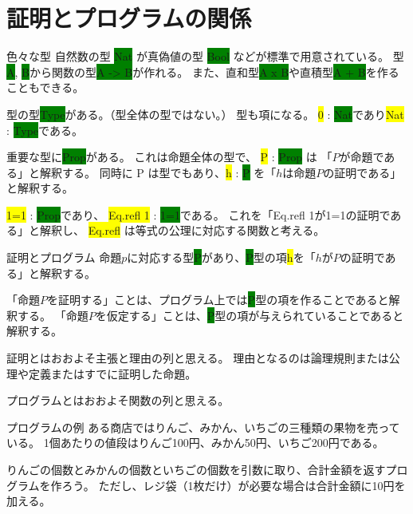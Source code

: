 \documentclass[unicode,12pt]{beamer}%
\newcommand{\type}[1]{\colorbox{green}{#1}}
\newcommand{\term}[1]{\colorbox{yellow}{#1}}
\begin{document}
\section{証明とプログラムの関係}

\begin{frame}{色々な型}
  自然数の型 \type{Nat} が真偽値の型 \type{Bool} などが標準で用意されている。
  型\type{A}, \type{B}から関数の型\type{A -> B}が作れる。
  また、直和型\type{A x B}や直積型\type{A + B}を作ることもできる。

  \pause

  型の型\type{Type}がある。（型全体の型ではない。）
  型も項になる。
  \term{0} : \type{Nat}であり\term{Nat} : \type{Type}である。

  \pause

  重要な型に\type{Prop}がある。
  これは命題全体の型で、 \term{P} : \type{Prop} は 「$P$が命題である」と解釈する。
  同時に P は型でもあり、\term{h} : \type{P} を「$h$は命題$P$の証明である」と解釈する。

  \pause

  \term{1=1} : \type{Prop}であり、
  \term{Eq.refl 1} : \type{1=1}である。
  これを「Eq.refl 1が1=1の証明である」と解釈し、
  \term{Eq.refl} は等式の公理に対応する関数と考える。
\end{frame}

\begin{frame}{証明とプログラム}
  命題$p$に対応する型\type{P}があり、\type{P}型の項\term{h}を「$h$が$P$の証明である」と解釈する。

  「命題$P$を証明する」ことは、プログラム上では\type{P}型の項を作ることであると解釈する。
  「命題$P$を仮定する」ことは、\type{P}型の項が与えられていることであると解釈する。

  \pause

  証明とはおおよそ主張と理由の列と思える。
  理由となるのは論理規則または公理や定義またはすでに証明した命題。

  プログラムとはおおよそ関数の列と思える。
\end{frame}

\begin{frame}{プログラムの例}
  ある商店ではりんご、みかん、いちごの三種類の果物を売っている。
  1個あたりの値段はりんご100円、みかん50円、いちご200円である。

  りんごの個数とみかんの個数といちごの個数を引数に取り、合計金額を返すプログラムを作ろう。
  ただし、レジ袋（1枚だけ）が必要な場合は合計金額に10円を加える。
\end{frame}
\end{document}
